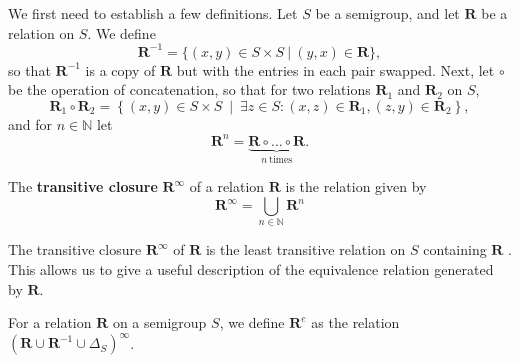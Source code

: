 We first need to establish a few definitions.  Let $S$ be a semigroup, and let
$\mathbf{R}$ be a relation on $S$.  We define
$$\mathbf{R}^{-1} = \{(x,y) \in S \times S ~|~ (y,x) \in \mathbf{R}\},$$
so that $\mathbf{R}^{-1}$ is a copy of $\mathbf{R}$ but with the entries in each
pair swapped.
Next, let $\circ$ be the operation of concatenation, so that for two relations
$\mathbf{R}_1$ and $\mathbf{R}_2$ on $S$,
$$\mathbf{R}_1 \circ \mathbf{R}_2 = \left\{(x,y) \in S \times S ~\middle|~
  \exists z \in S: (x,z) \in \mathbf{R}_1, (z,y) \in \mathbf{R}_2\right\},$$
and for $n \in \mathbb{N}$ let
$$\mathbf{R}^n = \underbrace{\mathbf{R} \circ \dots \circ \mathbf{R}}_{n~\text{times}}.$$

\begin{definition}
  \label{def:transitiveclosure}
  The \textbf{transitive closure} $\mathbf{R}^\infty$ of a relation $\mathbf{R}$
  is the relation given by
  $$\mathbf{R}^\infty=\bigcup_{n \in \mathbb{N}}\mathbf{R}^n$$
\end{definition}

The transitive closure $\mathbf{R}^\infty$ of $\mathbf{R}$ is the least
transitive relation on $S$ containing $\mathbf{R}$ \cite[Lemma
2.3]{mtorpey_msc}.  This allows us to give a useful description of the
equivalence relation generated by $\mathbf{R}$.

\begin{definition}
  \label{def:re}
  For a relation $\mathbf{R}$ on a semigroup $S$, we define $\mathbf{R}^e$ as
  the relation $\left(\mathbf{R} \cup \mathbf{R}^{-1} \cup \Delta_S\right)^\infty$.
\end{definition}

